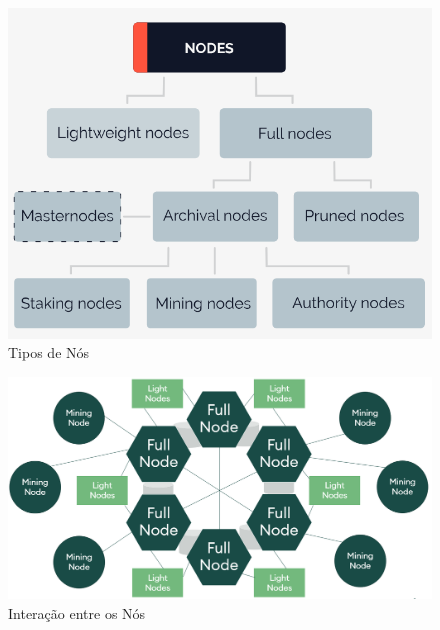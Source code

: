 \documentclass[conference]{IEEEtran}
\begin{document}
    \begin{figure}[H]
        \centering
        \includegraphics[scale=0.25]{images/types-of-nodes.png}
        \caption{Tipos de Nós \cite{3}}
        \label{fig:Tipos de Nós}
    \end{figure}
    \begin{figure}[H]
        \centering
        \includegraphics[scale=0.2]{images/nodes-interacting.png}
        \caption{Interação entre os Nós \cite{4}}
        \label{fig:Interação entre os Nós}
    \end{figure}
\end{document}

